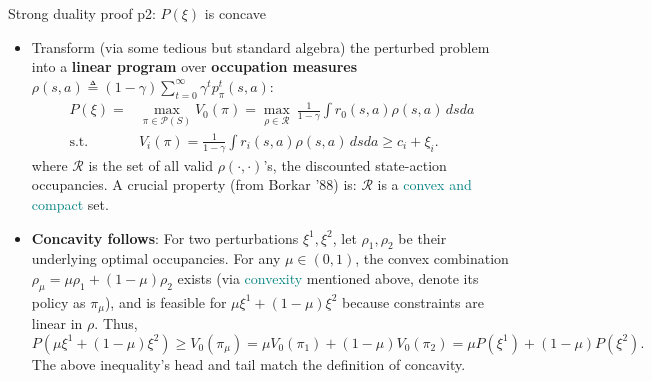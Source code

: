 \documentclass[aspectratio=43, 10pt]{beamer}
\begin{document}
    \begin{frame}[t]{Strong duality proof p2: $P(\xi)$ is concave} 

        \vspace{-0.3cm}
        \begin{itemize}[leftmargin=*, itemsep=1em]

        \item Transform (via some tedious but standard algebra) the perturbed problem into a \textbf{linear program} over \textbf{occupation measures} $\rho(s,a)\triangleq (1-\gamma) \sum_{t=0}^\infty \gamma^t p_{\pi}^t (s,a)$:
              \begin{align*}
                  P(\xi) =& \max_{\pi \in \mathcal{P}(S)} V_0(\pi)= \max_{\rho \in \mathcal{R}} \ \frac{1}{1-\gamma} \int r_0(s,a) \rho(s,a) \, dsda \\
                  \text{s.t. } & V_i(\pi) = \frac{1}{1-\gamma} \int r_i(s,a) \rho(s,a) \, dsda \geq c_i + \xi_i.
              \end{align*}
              where $\mathcal{R}$ is the set of all valid $\rho(\cdot, \cdot)$'s, the discounted state-action occupancies. A crucial property (from Borkar '88) is: $\mathcal{R}$ is a \textcolor{teal}{convex and compact} set. 

        \pause 
        
        \item \textbf{Concavity follows}: For two perturbations $\xi^1, \xi^2$, let $\rho_1, \rho_2$ be their underlying optimal occupancies. For any $\mu \in (0,1)$, the convex combination $\rho_{\mu} = \mu \rho_1 + (1-\mu)\rho_2$ exists (via \textcolor{teal}{convexity} mentioned above, denote its policy as $\pi_\mu$), and is feasible for $\mu \xi^1 + (1-\mu)\xi^2$ because constraints are linear in $\rho$. Thus,
              \[
                  P(\mu \xi^1 + (1-\mu)\xi^2) \geq V_0(\pi_\mu) = \mu V_0(\pi_1) + (1-\mu)V_0(\pi_2) = \mu P(\xi^1) + (1-\mu) P(\xi^2).
              \]
              The above inequality's head and tail match the definition of concavity.
    \end{itemize}
    \end{frame}
\end{document}
